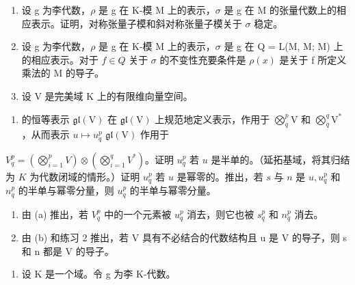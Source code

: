 
\begin{enumerate}
\def\labelenumi{\arabic{enumi}.}
\item
  设 g 为李代数，\(\rho\) 是 g 在 K-模 M 上的表示，\(\sigma\) 是 g 在 M 的张量代数上的相应表示。证明，对称张量子模和斜对称张量子模关于 \(\sigma\) 稳定。
\item
  设 g 为李代数，\(\rho\) 是 g 在 K-模 M 上的表示，\(\sigma\) 是 g 在 Q = L(M, M; M) 上的相应表示。对于 \(f \in Q\) 关于 \(\sigma\)  的不变性充要条件是 \(\rho(x)\) 是关于 f 所定义乘法的 M 的导子。
\item
  设 V 是完美域 K 上的有限维向量空间。
\end{enumerate}

\begin{enumerate}
\def\labelenumi{(\alph{enumi})}
\tightlist
\item
   的恒等表示 \(\mathfrak{gl}(\mathrm{V})\) 在 \(\mathfrak{gl}(\mathrm{V})\) 上规范地定义表示，作用于 \(\bigotimes_{q}^{p}\mathrm{V}\) 和 \(\bigotimes_{q}^{q}\mathrm{V}^{*}\)，从而表示 \(u\mapsto u_q^p\) \(\mathfrak{gl}(\mathrm{V})\) 作用于
\end{enumerate}

\(V_{q}^{p} = \left( \bigotimes_{i=1}^{p} V \right) \otimes \left( \bigotimes_{i=1}^{q} V^{*} \right)\)。证明 \(u_{q}^{p}\) 若 \(u\) 是半单的。（延拓基域，将其归结为 \(K\) 为代数闭域的情形。）证明 \(u_{q}^{p}\) 若 \(u\) 是幂零的。推出，若 \(s\) 与 \(n\) 是 \(u, u_{q}^{p}\) 和 \(n_{q}^{p}\) 的半单与幂零分量，则 \(u_{q}^{p}\) 的半单与幂零分量。

\begin{enumerate}
\def\labelenumi{(\alph{enumi})}
\setcounter{enumi}{1}
\item
  由 (a) 推出，若 \(V_q^p\) 中的一个元素被 \(u_q^p\)  消去，则它也被 \(s_q^p\) 和 \(n_q^p\) 消去。
\item
  由 (b) 和练习 2 推出，若 V 具有不必结合的代数结构且 u 是 V 的导子，则 s 和 n 都是 V 的导子。
\end{enumerate}

\begin{enumerate}
\def\labelenumi{\arabic{enumi}.}
\setcounter{enumi}{3}
\tightlist
\item
  设 K 是一个域。令 g 为李 K-代数。
\end{enumerate}

